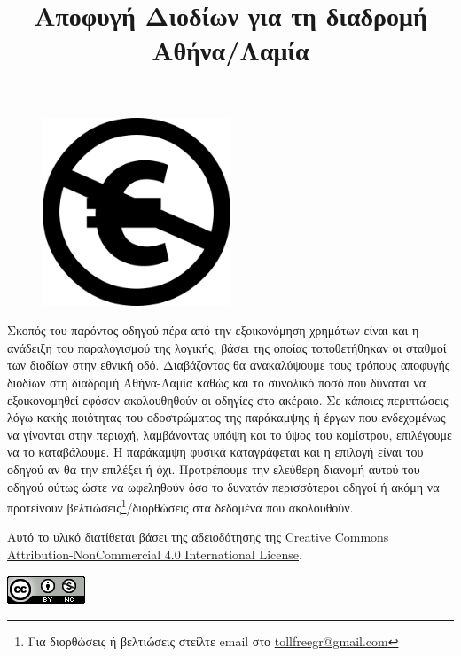 \documentclass[a4paper,12pt]{article}
\title{\LARGE Αποφυγή Διοδίων για τη διαδρομή Αθήνα/Λαμία}
\date{}
\author{}
\begin{document}
\begin{titlepage}


\maketitle
\begin{figure}[hbp!]
	\centering
		\includegraphics[width=0.5\textwidth]{Nc-eu.svg.png}
\end{figure}
\abstract Σκοπός του παρόντος οδηγού πέρα από την εξοικονόμηση χρημάτων είναι και η ανάδειξη του παραλογισμού της λογικής, βάσει της οποίας τοποθετήθηκαν οι σταθμοί των διοδίων στην εθνική οδό. Διαβάζοντας θα ανακαλύψουμε τους τρόπους αποφυγής διοδίων στη διαδρομή Αθήνα-Λαμία καθώς και το συνολικό ποσό που δύναται να εξοικονομηθεί εφόσον ακολουθηθούν οι οδηγίες στο ακέραιο. Σε κάποιες περιπτώσεις λόγω κακής ποιότητας του οδοστρώματος της παράκαμψης ή έργων που ενδεχομένως να γίνονται στην περιοχή, λαμβάνοντας υπόψη και το ύψος του κομίστρου, επιλέγουμε να το καταβάλουμε. Η παράκαμψη φυσικά καταγράφεται και η επιλογή είναι του οδηγού αν θα την επιλέξει ή όχι. Προτρέπουμε την ελεύθερη διανομή αυτού του οδηγού ούτως ώστε να ωφεληθούν όσο το δυνατόν περισσότεροι οδηγοί ή ακόμη να προτείνουν βελτιώσεις\footnote{Για διορθώσεις ή βελτιώσεις στείλτε email στο \href{mailto:tollfreegr@gmail.com}{tollfreegr@gmail.com}}/διορθώσεις στα δεδομένα που ακολουθούν.
 
\vspace{3cm}
\begin{center}
{\footnotesize Αυτό το υλικό διατίθεται βάσει της αδειοδότησης της \href{http://creativecommons.org/licenses/by-nc/4.0/}{Creative Commons Attribution-NonCommercial 4.0 International License}.}

\includegraphics[scale=0.5]{cc.png} 
\end{center}

\thispagestyle{empty}
\end{titlepage}
\tableofcontents
\newpage


\end{document}
